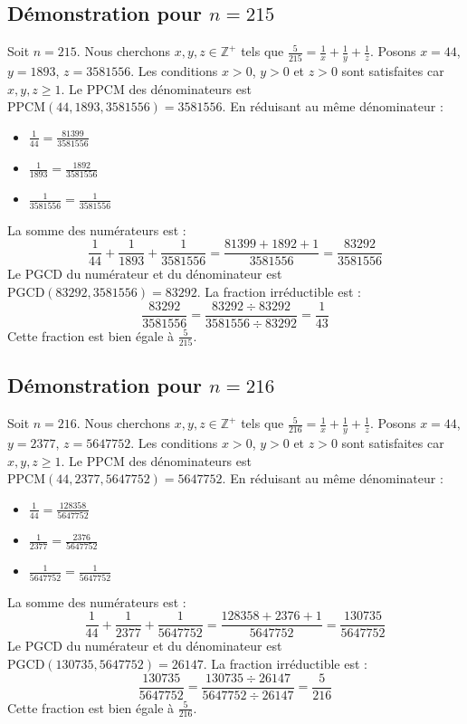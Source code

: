 \documentclass[11pt,a4paper]{article}
\begin{document}
\subsection{Démonstration pour $n = 215$}
Soit $n = 215$. Nous cherchons $x, y, z \in \mathbb{Z}^{+}$ tels que $\frac{5}{215} = \frac{1}{x} + \frac{1}{y} + \frac{1}{z}$.
Posons $x = 44$, $y = 1893$, $z = 3581556$.
Les conditions $x > 0$, $y > 0$ et $z > 0$ sont satisfaites car $x, y, z \geq 1$.
Le PPCM des dénominateurs est $\text{PPCM}(44, 1893, 3581556) = 3581556$.
En réduisant au même dénominateur :
\begin{itemize}
    \item $\frac{1}{44} = \frac{81399}{3581556}$
    \item $\frac{1}{1893} = \frac{1892}{3581556}$
    \item $\frac{1}{3581556} = \frac{1}{3581556}$
\end{itemize}
La somme des numérateurs est :
$$ \frac{1}{44} + \frac{1}{1893} + \frac{1}{3581556} = \frac{81399 + 1892 + 1}{3581556} = \frac{83292}{3581556} $$
Le PGCD du numérateur et du dénominateur est $\text{PGCD}(83292, 3581556) = 83292$.
La fraction irréductible est :
$$ \frac{83292}{3581556} = \frac{83292 \div 83292}{3581556 \div 83292} = \frac{1}{43} $$
Cette fraction est bien égale à $\frac{5}{215}$.

\subsection{Démonstration pour $n = 216$}
Soit $n = 216$. Nous cherchons $x, y, z \in \mathbb{Z}^{+}$ tels que $\frac{5}{216} = \frac{1}{x} + \frac{1}{y} + \frac{1}{z}$.
Posons $x = 44$, $y = 2377$, $z = 5647752$.
Les conditions $x > 0$, $y > 0$ et $z > 0$ sont satisfaites car $x, y, z \geq 1$.
Le PPCM des dénominateurs est $\text{PPCM}(44, 2377, 5647752) = 5647752$.
En réduisant au même dénominateur :
\begin{itemize}
    \item $\frac{1}{44} = \frac{128358}{5647752}$
    \item $\frac{1}{2377} = \frac{2376}{5647752}$
    \item $\frac{1}{5647752} = \frac{1}{5647752}$
\end{itemize}
La somme des numérateurs est :
$$ \frac{1}{44} + \frac{1}{2377} + \frac{1}{5647752} = \frac{128358 + 2376 + 1}{5647752} = \frac{130735}{5647752} $$
Le PGCD du numérateur et du dénominateur est $\text{PGCD}(130735, 5647752) = 26147$.
La fraction irréductible est :
$$ \frac{130735}{5647752} = \frac{130735 \div 26147}{5647752 \div 26147} = \frac{5}{216} $$
Cette fraction est bien égale à $\frac{5}{216}$.
\end{document}

